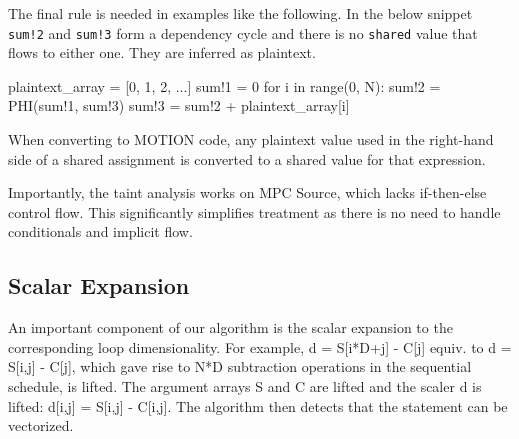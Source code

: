 The final rule is needed in examples like the following. In the below snippet \texttt{sum!2} and \texttt{sum!3} form a dependency cycle and there is no \texttt{shared} value that flows to either one.
They are inferred as plaintext.
{\small
\begin{pythonn}
plaintext_array = [0, 1, 2, ...]
sum!1 = 0
for i in range(0, N):
    sum!2 = PHI(sum!1, sum!3)
    sum!3 = sum!2 + plaintext_array[i]
\end{pythonn}
}

When converting to MOTION code, any plaintext value used in the right-hand side of a shared assignment is converted to a shared value for that expression.

Importantly, the taint analysis works on MPC Source, which lacks if-then-else control flow.
This significantly simplifies treatment as there is no need to handle conditionals and implicit flow.



\subsection{Scalar Expansion}

An important component of our algorithm is the scalar expansion to the corresponding loop dimensionality.
For example, {\sf d = S[i*D+j] - C[j]} equiv. to {\sf d = S[i,j] - C[j]}, which gave rise to {\sf N*D} subtraction operations in the sequential schedule,
is lifted. The argument arrays {\sf S} and {\sf C} are lifted and the scaler {\sf d} is lifted: {\sf d[i,j] = S[i,j] - C[i,j]}.
The algorithm then detects that the statement can be vectorized.

